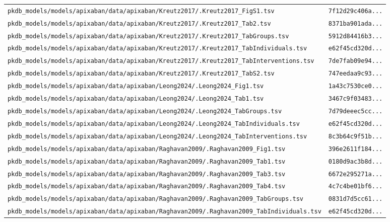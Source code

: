 \documentclass{article}
\begin{document}
\begin{longtable}{ll}
\texttt{pkdb\_models/models/apixaban/data/apixaban/Kreutz2017/.Kreutz2017\_FigS1.tsv} & \texttt{7f12d29c406a...} \\
\texttt{pkdb\_models/models/apixaban/data/apixaban/Kreutz2017/.Kreutz2017\_Tab2.tsv} & \texttt{8371ba901ada...} \\
\texttt{pkdb\_models/models/apixaban/data/apixaban/Kreutz2017/.Kreutz2017\_TabGroups.tsv} & \texttt{5912d84416b3...} \\
\texttt{pkdb\_models/models/apixaban/data/apixaban/Kreutz2017/.Kreutz2017\_TabIndividuals.tsv} & \texttt{e62f45cd320d...} \\
\texttt{pkdb\_models/models/apixaban/data/apixaban/Kreutz2017/.Kreutz2017\_TabInterventions.tsv} & \texttt{7de7fab09e94...} \\
\texttt{pkdb\_models/models/apixaban/data/apixaban/Kreutz2017/.Kreutz2017\_TabS2.tsv} & \texttt{747eedaa9c93...} \\
\texttt{pkdb\_models/models/apixaban/data/apixaban/Leong2024/.Leong2024\_Fig1.tsv} & \texttt{1a43c7530ce0...} \\
\texttt{pkdb\_models/models/apixaban/data/apixaban/Leong2024/.Leong2024\_Tab1.tsv} & \texttt{3467c9f03483...} \\
\texttt{pkdb\_models/models/apixaban/data/apixaban/Leong2024/.Leong2024\_TabGroups.tsv} & \texttt{7d79deeec5cc...} \\
\texttt{pkdb\_models/models/apixaban/data/apixaban/Leong2024/.Leong2024\_TabIndividuals.tsv} & \texttt{e62f45cd320d...} \\
\texttt{pkdb\_models/models/apixaban/data/apixaban/Leong2024/.Leong2024\_TabInterventions.tsv} & \texttt{8c3b64c9f51b...} \\
\texttt{pkdb\_models/models/apixaban/data/apixaban/Raghavan2009/.Raghavan2009\_Fig1.tsv} & \texttt{396e2611f184...} \\
\texttt{pkdb\_models/models/apixaban/data/apixaban/Raghavan2009/.Raghavan2009\_Tab1.tsv} & \texttt{0180d9ac3b8d...} \\
\texttt{pkdb\_models/models/apixaban/data/apixaban/Raghavan2009/.Raghavan2009\_Tab3.tsv} & \texttt{6672e295271a...} \\
\texttt{pkdb\_models/models/apixaban/data/apixaban/Raghavan2009/.Raghavan2009\_Tab4.tsv} & \texttt{4c7c4be01bf6...} \\
\texttt{pkdb\_models/models/apixaban/data/apixaban/Raghavan2009/.Raghavan2009\_TabGroups.tsv} & \texttt{0831d7d5cc61...} \\
\texttt{pkdb\_models/models/apixaban/data/apixaban/Raghavan2009/.Raghavan2009\_TabIndividuals.tsv} & \texttt{e62f45cd320d...} \\

\end{longtable}
\end{document}
